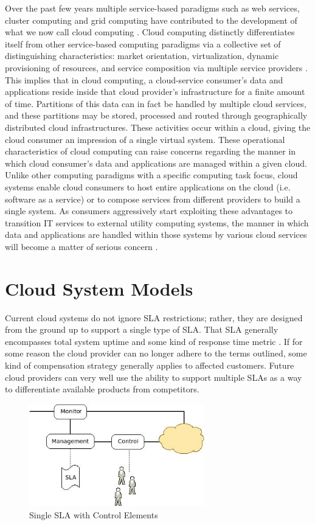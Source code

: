 \documentclass[a4paper,twoside]{article}
\begin{document}
Over the past few years multiple service-based paradigms such as web services, cluster computing and grid computing have contributed to the development of what we now call cloud computing \cite{Bu:09}. Cloud computing distinctly differentiates itself from other service-based computing paradigms via a collective set of distinguishing characteristics:  market orientation, virtualization, dynamic provisioning of resources, and service composition via multiple service providers \cite{BuYeVeBrBr:09}. This implies that in cloud computing, a cloud-service consumer's data and applications reside inside that cloud provider's infrastructure for a finite amount of time.  Partitions of this data can in fact be handled by multiple cloud services, and these partitions may be stored, processed and routed through geographically distributed cloud infrastructures. These activities occur within a cloud, giving the cloud consumer an impression of a single virtual system.  These operational characteristics of cloud computing can raise concerns regarding the manner in which cloud consumer's data and applications are managed within a given cloud. Unlike other computing paradigms with a specific computing task focus, cloud systems enable cloud consumers to host entire applications on the cloud (i.e. software as a service) or to compose services from different providers to build a single system. As consumers aggressively start exploiting these advantages to transition IT services to external utility computing systems, the manner in which data and applications are handled within those systems by various cloud services will become a matter of serious concern \cite{Jamkhedkar:2010:IUM:1866870.1866885}.
\section{Cloud System Models}\label{sec:cloud-models}
\noindent Current cloud systems do not ignore SLA restrictions; rather, they are designed from the ground up to support a single type of SLA.  That SLA generally encompasses total system uptime and some kind of response time metric \cite{ctrl:amazon-sla,ctrl:rackspace-sla}.  If for some reason the cloud provider can no longer adhere to the terms outlined, some kind of compensation strategy generally applies to affected customers.  Future cloud providers can very well use the ability to support multiple SLAs as a way to differentiate available products from competitors.

\begin{figure}[!t]
\centering
\includegraphics[width=3in]{cloud-current}
\caption{Single SLA with Control Elements}
\label{fig:current-cloud-model}
\end{figure}
\end{document}
